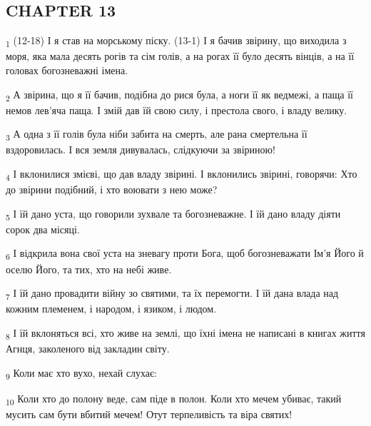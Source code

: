 \subsection{CHAPTER 13}
\begin{tcolorbox}
\textsubscript{1} (12-18) І я став на морському піску. (13-1) І я бачив звірину, що виходила з моря, яка мала десять рогів та сім голів, а на рогах її було десять вінців, а на її головах богозневажні імена.
\end{tcolorbox}
\begin{tcolorbox}
\textsubscript{2} А звірина, що я її бачив, подібна до рися була, а ноги її як ведмежі, а паща її немов лев'яча паща. І змій дав їй свою силу, і престола свого, і владу велику.
\end{tcolorbox}
\begin{tcolorbox}
\textsubscript{3} А одна з її голів була ніби забита на смерть, але рана смертельна її вздоровилась. І вся земля дивувалась, слідкуючи за звіриною!
\end{tcolorbox}
\begin{tcolorbox}
\textsubscript{4} І вклонилися змієві, що дав владу звірині. І вклонились звірині, говорячи: Хто до звірини подібний, і хто воювати з нею може?
\end{tcolorbox}
\begin{tcolorbox}
\textsubscript{5} І їй дано уста, що говорили зухвале та богозневажне. І їй дано владу діяти сорок два місяці.
\end{tcolorbox}
\begin{tcolorbox}
\textsubscript{6} І відкрила вона свої уста на зневагу проти Бога, щоб богозневажати Ім'я Його й оселю Його, та тих, хто на небі живе.
\end{tcolorbox}
\begin{tcolorbox}
\textsubscript{7} І їй дано провадити війну зо святими, та їх перемогти. І їй дана влада над кожним племенем, і народом, і язиком, і людом.
\end{tcolorbox}
\begin{tcolorbox}
\textsubscript{8} І їй вклоняться всі, хто живе на землі, що їхні імена не написані в книгах життя Агнця, заколеного від закладин світу.
\end{tcolorbox}
\begin{tcolorbox}
\textsubscript{9} Коли має хто вухо, нехай слухає:
\end{tcolorbox}
\begin{tcolorbox}
\textsubscript{10} Коли хто до полону веде, сам піде в полон. Коли хто мечем убиває, такий мусить сам бути вбитий мечем! Отут терпеливість та віра святих!
\end{tcolorbox}
